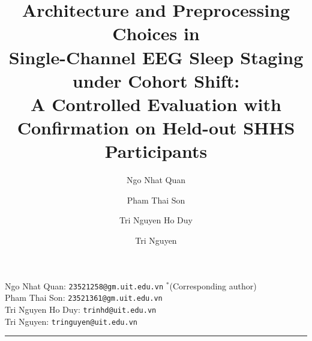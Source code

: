 \documentclass[11pt,a4paper]{article}
\begin{document}
\title{\bfseries\LARGE Architecture and Preprocessing Choices in\\[0.15em]
Single-Channel EEG Sleep Staging under Cohort Shift:\\[0.15em]
\Large A Controlled Evaluation with Confirmation on Held-out SHHS Participants}

\author[a,$\ast$]{Ngo Nhat Quan}
\author[a]{Pham Thai Son}
\author[a]{Tri Nguyen Ho Duy}
\author[a]{Tri Nguyen}

\date{}

\maketitle
\thispagestyle{empty}

\vspace{-1.0em}
\begin{center}
\small
Ngo Nhat Quan: \texttt{23521258@gm.uit.edu.vn} $^{\ast}$(Corresponding author) \\[0.2em]
Pham Thai Son: \texttt{23521361@gm.uit.edu.vn} \\[0.2em]
Tri Nguyen Ho Duy: \texttt{trinhd@uit.edu.vn} \\[0.2em]
Tri Nguyen: \texttt{tringuyen@uit.edu.vn}
\end{center}

\vspace{0.4em}
\begin{center}\rule{0.9\textwidth}{0.4pt}\end{center}
\vspace{-0.2em}
\end{document}
